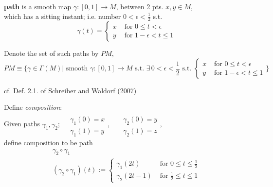 \begin{definition}[path]
	\textbf{path} is a smooth map $\gamma:[0,1] \to M$, between 2 pts. $x,y \in M$, \\
	which has a sitting instant; i.e. number $0 < \epsilon < \frac{1}{2}$ s.t. 
	\begin{equation}
	\gamma(t) = \begin{cases} x & \text{ for } 0 \leq t < \epsilon \\
	y & \text{ for } 1 - \epsilon < t \leq 1 \end{cases}
	\end{equation}

Denote the set of such paths by $PM$, 
\begin{equation}
PM \equiv \lbrace \gamma \in \Gamma(M) | \text{ smooth } \gamma : [0,1] \to M \text{ s.t. } \exists \, 0 < \epsilon < \frac{1}{2} \text{ s.t. } \begin{cases} x & \text{ for } 0 \leq t < \epsilon \\
y & \text{ for } 1 - \epsilon < t \leq 1 \end{cases} \rbrace
\end{equation}
\end{definition}
cf. Def. 2.1. of Schreiber and Waldorf (2007)\cite{dgdt:ScWa2007}  

Define \emph{composition}: \\
Given paths $\gamma_1, \gamma_2$; $\begin{aligned} & \qquad \\ 
& \gamma_1(0) = x \\
& \gamma_1(1) = y \end{aligned}$, \, $\begin{aligned} & \qquad \\ 
& \gamma_2(0) = y \\
& \gamma_2(1) = z \end{aligned}$, \\
define composition to be path 
\begin{equation}
\begin{gathered}
\gamma_2 \circ \gamma_1 \\
(\gamma_2 \circ \gamma_1)(t) := \begin{cases} \gamma_1(2t) & \text{ for } 0 \leq t \leq \frac{1}{2} \\
\gamma_2(2t-1) & \text{ for } \frac{1}{2} \leq t \leq 1 \end{cases} 
\end{gathered}
\end{equation}

